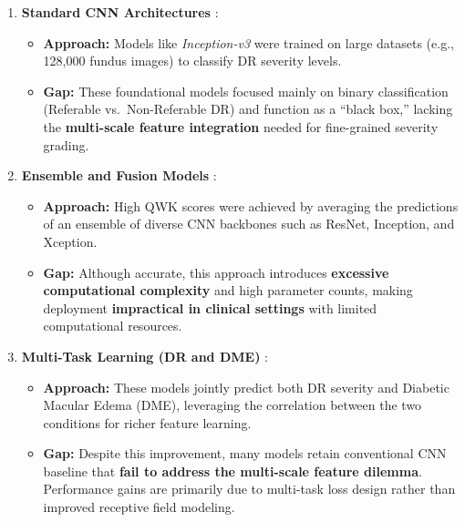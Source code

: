 \documentclass[12pt,a4paper]{article}
\begin{document}
\begin{enumerate}
    \item \textbf{Standard CNN Architectures} \cite{Gulshan2016}:
    \begin{itemize}[noitemsep, topsep=0pt]
        \item \textbf{Approach:} Models like \textit{Inception-v3} were trained on large datasets (e.g., 128,000 fundus images) to classify DR severity levels.
        \item \textbf{Gap:} These foundational models focused mainly on binary classification (Referable vs.\ Non-Referable DR) and function as a “black box,” lacking the \textbf{multi-scale feature integration} needed for fine-grained severity grading.
    \end{itemize}
    
    \item \textbf{Ensemble and Fusion Models} \cite{Qummar2019}:
    \begin{itemize}[noitemsep, topsep=0pt]
        \item \textbf{Approach:} High QWK scores were achieved by averaging the predictions of an ensemble of diverse CNN backbones such as ResNet, Inception, and Xception.
        \item \textbf{Gap:} Although accurate, this approach introduces \textbf{excessive computational complexity} and high parameter counts, making deployment \textbf{impractical in clinical settings} with limited computational resources.
    \end{itemize}
    
    \item \textbf{Multi-Task Learning (DR and DME)} \cite{Li2019}:
    \begin{itemize}[noitemsep, topsep=0pt]
        \item \textbf{Approach:} These models jointly predict both DR severity and Diabetic Macular Edema (DME), leveraging the correlation between the two conditions for richer feature learning.
        \item \textbf{Gap:} Despite this improvement, many models retain conventional CNN baseline that \textbf{fail to address the multi-scale feature dilemma}. Performance gains are primarily due to multi-task loss design rather than improved receptive field modeling.
    \end{itemize}
    

\end{enumerate}
\end{document}
